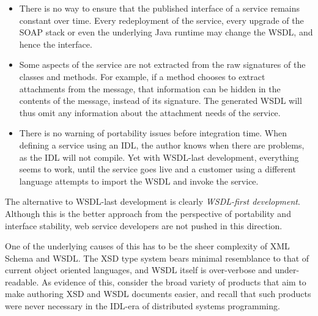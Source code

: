 \begin{itemize}

\item
    
There is no way to ensure that the published interface of a service
remains constant over time. Every redeployment of the service, every
upgrade of the SOAP stack or even the underlying Java runtime may
change the WSDL, and hence the interface.

\item

Some aspects of the service are not extracted from the raw signatures
of the classes and methods. For example, if a method chooses to extract
attachments from the message, that information can be hidden in the contents
of the message, instead of its signature. The generated WSDL will thus
omit any information about the attachment needs of the service.

\item

There is no warning of portability issues before integration time. 
When defining a service using an IDL, the author knows
when there are problems, as the IDL will not compile. Yet with WSDL-last
development, everything seems to work, until the service goes live and
a customer using a different language attempts to import the WSDL and
invoke the service.

% 

    
\end{itemize}

The alternative to WSDL-last development is clearly \emph{WSDL-first
development}. Although this is the better approach from the perspective
of portability and interface stability, web service developers are not
pushed in this direction.

One of the underlying causes of this has to be the sheer complexity of
XML Schema and WSDL. The XSD type system bears minimal resemblance to
that of current object oriented languages, and WSDL itself is
over-verbose and under-readable. As evidence of this, consider the
broad variety of products that aim to make authoring XSD and WSDL
documents easier, and recall that such products were never necessary
in the IDL-era of distributed systems programming.

